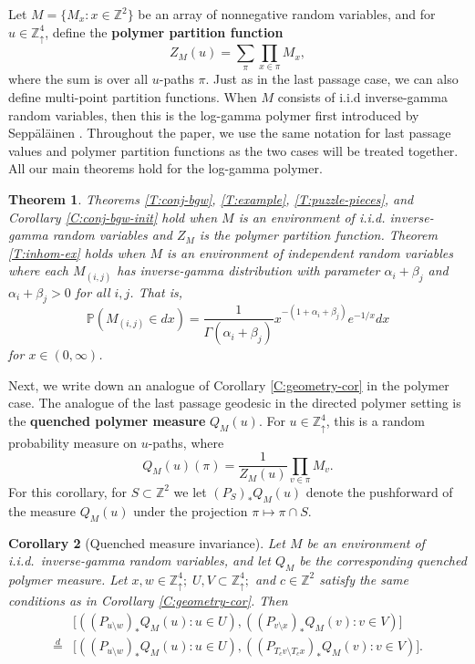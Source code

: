 \documentclass[aop, preprint]{imsart}
\theoremstyle{plain}
\newtheorem{theorem}{Theorem}[section]
\newtheorem{corollary}[theorem]{Corollary}
\theoremstyle{definition}
\theoremstyle{plain}
\newcommand{\p}{\mathbb{P}}
\newcommand{\sset}{\subset}
\newcommand{\al}{\alpha}
\newcommand{\be}{\beta}
\newcommand{\Ga}{\Gamma}
\newcommand{\Zd}{\mathds{Z}^4_\uparrow}
\newcommand{\Z}{\mathds{Z}}
\newcommand{\eqd}{\stackrel{d}{=}}
\newcommand{\smin}{\setminus}
\begin{document}
Let $M = \{M_x : x \in \Z^2\}$ be an array of nonnegative random variables, and for $u \in \Zd$, define the \textbf{polymer partition function} 
$$
Z_M(u) = \sum_\pi \prod_{x \in \pi} M_x,
$$
where the sum is over all $u$-paths $\pi$. Just as in the last passage case, we can also define multi-point partition functions. When $M$ consists of i.i.d inverse-gamma random variables, then this is the log-gamma polymer first introduced by Sepp\"al\"ainen \citep{seppalainen2012scaling}. Throughout the paper, we use the same notation for last passage values and polymer partition functions as the two cases will be treated together. All our main theorems hold for the log-gamma polymer.

\begin{theorem}
	\label{T:polymers}
	Theorems \ref{T:conj-bgw}, \ref{T:example}, \ref{T:puzzle-pieces}, and Corollary \ref{C:conj-bgw-init} hold when $M$ is an environment of i.i.d. inverse-gamma random variables and $Z_M$ is the polymer partition function. Theorem \ref{T:inhom-ex} holds when $M$ is an environment of independent random variables where each $M_{(i, j)}$ has inverse-gamma distribution with parameter $\al_i + \be_j$ and $\al_i + \be_j > 0$ for all $i, j$. That is,
	$$
	\p(M_{(i, j)} \in dx) = \frac{1}{\Ga(\al_i + \be_j)} x^{-(1 + \al_i + \be_j)}e^{-1/x} dx
	$$
	for $x \in (0, \infty)$.
\end{theorem}

Next, we write down an analogue of Corollary \ref{C:geometry-cor} in the polymer case.
The analogue of the last passage geodesic in the directed polymer setting is the \textbf{quenched polymer measure} $Q_M(u)$. For $u \in \Zd$, this is a random probability measure on $u$-paths, where
$$
Q_M(u)(\pi) = \frac{1}{Z_M(u)} \prod_{v \in \pi} M_v.
$$
For this corollary, for $S \sset \Z^2$ we let $(P_S)_* Q_M(u)$ denote the pushforward of the measure $Q_M(u)$ under the projection $\pi \mapsto \pi \cap S$. 

\begin{corollary}[Quenched measure invariance]
	\label{C:quenched-cor}
	Let $M$ be an environment of i.i.d.\ inverse-gamma random variables, and let $Q_M$ be the corresponding quenched polymer measure. Let $x, w \in \Zd; \;U, V \sset \Zd;$ and $c \in \Z^2$ satisfy the same conditions as in Corollary \ref{C:geometry-cor}. Then
	\begin{align*}
	&\big[((P_{u \smin w})_* Q_M(u) : u \in U), ((P_{v \smin x})_* Q_M(v) : v \in V)\big] \\
	\eqd &\big[((P_{u \smin w})_* Q_M(u) : u \in U), ((P_{T_c v \smin T_c x})_* Q_M(v) : v \in V)\big].
	\end{align*}
\end{corollary}
\end{document}
